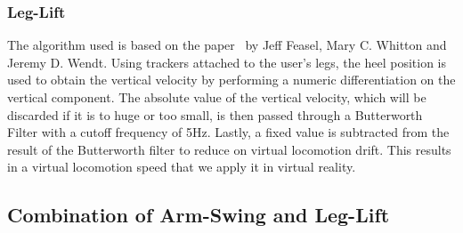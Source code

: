 \documentclass[manuscript,review,anonymous]{acmart}
\begin{document}






\subsubsection{Leg-Lift}
The algorithm used is based on the paper~\cite{legLift2008} by Jeff Feasel, Mary C. Whitton and Jeremy D. Wendt. Using trackers attached to the user's legs, the heel position is used to obtain the vertical velocity by performing a numeric differentiation on the vertical component. The absolute value of the vertical velocity, which will be discarded if it is to huge or too small, is then passed through a Butterworth Filter with a cutoff frequency of 5Hz. Lastly, a fixed value is subtracted from the result of the Butterworth filter to reduce on virtual locomotion drift. This results in a virtual locomotion speed that we apply it in virtual reality.

\subsection{Combination of Arm-Swing and Leg-Lift}
\end{document}
